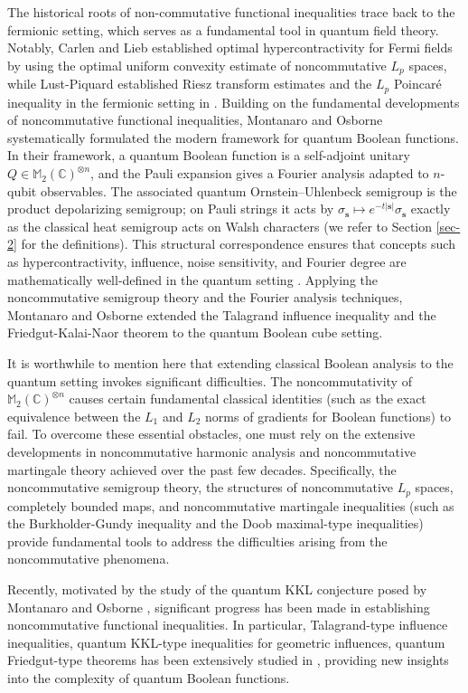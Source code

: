 \documentclass{amsbook}
\theoremstyle{definition}
\theoremstyle{remark}
\numberwithin{section}{chapter}
\numberwithin{equation}{chapter}
\newcommand{\1}{\mathbf{1}}
\newcommand{\s}{\mathbf{s}}
\begin{document}
The historical roots of non-commutative functional inequalities trace back to the fermionic setting, which serves as a fundamental tool in quantum field theory. Notably, Carlen and Lieb \cite{CL1993} established optimal hypercontractivity for Fermi fields by using the optimal uniform convexity estimate of noncommutative $L_{p}$ spaces, while Lust-Piquard established Riesz transform estimates and the $L_{p}$ Poincar\'e inequality in the fermionic setting in  \cite{ELP2008, Lu1998}. Building on the fundamental developments of noncommutative functional inequalities, Montanaro and Osborne \cite{MO2010} systematically formulated the modern framework for quantum Boolean functions. In their framework, a quantum Boolean function is a self-adjoint unitary $Q\in \mathbb{M}_{2}(\mathbb{C})^{\otimes n}$, and the Pauli expansion gives a Fourier analysis adapted to $n$-qubit observables. The associated quantum Ornstein--Uhlenbeck semigroup is the product depolarizing semigroup; on Pauli strings it acts by $\sigma_{\s}\mapsto e^{-t|\s|}\sigma_{\s}$ exactly as the classical heat semigroup acts on Walsh characters (we refer to Section \ref{sec-2} for the definitions). This structural correspondence ensures that concepts such as hypercontractivity, influence, noise sensitivity, and Fourier degree are mathematically well-defined in the quantum setting \cite{MO2010,Ki2014}. Applying the noncommutative semigroup theory and the Fourier analysis techniques, Montanaro and Osborne extended the Talagrand influence inequality and the Friedgut-Kalai-Naor theorem to the quantum Boolean cube setting.

It is worthwhile to mention here that extending classical Boolean analysis to the quantum setting invokes significant difficulties. The noncommutativity of $\mathbb{M}_{2}(\mathbb{C})^{\otimes n}$ causes certain fundamental classical identities (such as the exact equivalence between the $L_1$ and $L_2$ norms of gradients for Boolean functions) to fail. To overcome these essential obstacles, one must rely on the extensive developments in noncommutative harmonic analysis and noncommutative martingale theory achieved over the past few decades. Specifically, the noncommutative semigroup theory, the structures of noncommutative $L_{p}$ spaces, completely bounded maps, and noncommutative martingale inequalities (such as the Burkholder-Gundy inequality and the Doob maximal-type inequalities) provide fundamental tools to address the difficulties arising from the noncommutative phenomena.

Recently, motivated by the study of the quantum KKL conjecture posed by Montanaro and Osborne \cite{MO2010}, significant progress has been made in establishing noncommutative functional inequalities. In particular,  Talagrand-type influence inequalities, quantum KKL-type inequalities for geometric influences, quantum Friedgut-type theorems has been extensively studied in \cite{BGX2025,JLLZ2025,RWZ2024}, providing new insights into the complexity of quantum Boolean functions. 
\end{document}

